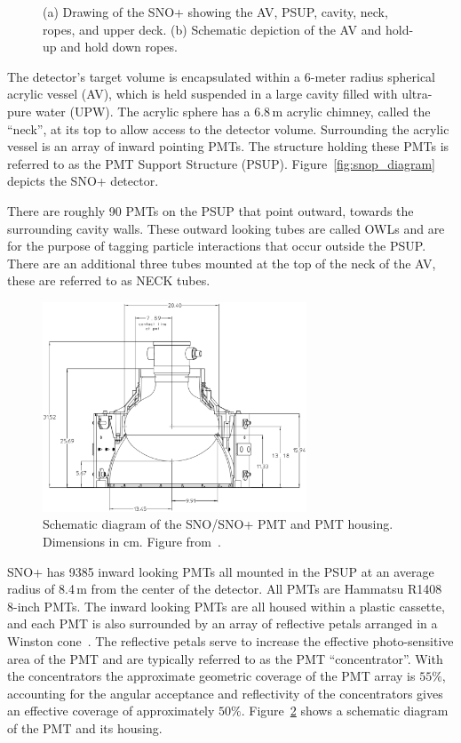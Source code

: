 \begin{figure}[htbp]
\label{fig:snop_diagrams}
    \caption[SNO+ Detector]{(a) Drawing of the SNO+ showing the
    AV, PSUP, cavity, neck, ropes, and upper deck. (b) Schematic
    depiction of the AV and hold-up and hold down ropes.}
\end{figure}

The detector's target volume is encapsulated within a 6-meter radius spherical acrylic vessel (AV),
which is held suspended in a large cavity filled with ultra-pure water (UPW)\@.
The acrylic sphere has a 6.8\,m acrylic chimney, called the ``neck'', at its top
to allow access to the detector volume.
Surrounding the acrylic vessel is an  array of inward pointing PMTs.
The structure holding these PMTs is referred to as the PMT Support Structure
(PSUP).
Figure~\ref{fig:snop_diagram} depicts the SNO+ detector.

There are roughly 90 PMTs on the PSUP that point outward, towards the surrounding cavity
walls.
These outward looking tubes are called OWLs and are for the purpose of tagging
particle interactions that occur outside the PSUP\@.
There are an additional three tubes mounted at the top of the neck of the AV,
these are referred to as NECK tubes.


\begin{figure}[htbp]
    \centering
    \includegraphics[width=0.7\textwidth]{sno_casette}
    \caption[PMT Casette] {Schematic diagram of the SNO/SNO+ PMT and
    PMT housing. Dimensions in cm. Figure from~\citep{sno_detector_paper}.}
\label{fig:sno_pmt_casette}
\end{figure}

SNO+ has 9385 inward looking PMTs all mounted in the PSUP at an average radius
of 8.4\,m from the center of the detector.
All PMTs are Hammatsu R1408 8-inch PMTs.
The inward looking PMTs are all housed within a plastic cassette,
and each PMT is also surrounded by an array of reflective
petals arranged in a Winston cone~\cite{winston}.
The reflective petals serve to increase the effective photo-sensitive area
of the PMT and are typically referred to as the PMT ``concentrator''.
With the concentrators the approximate geometric coverage of the PMT array is $55\%$,
accounting for the angular acceptance and reflectivity of the concentrators gives
an effective coverage of approximately $50\%$.
Figure~\ref{fig:sno_pmt_casette} shows a schematic diagram of the PMT and
its housing.

